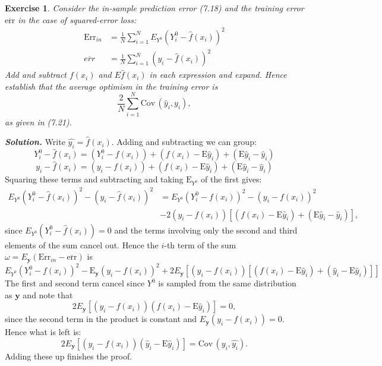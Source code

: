 \documentclass[12pt]{article}
\def\Err{\text{Err}}
\def\err{\text{err}}
\def\Cov{\text{Cov}}
\def\by{\textbf{y}}
\def\E{\text{E}}
\newtheorem{exercise}{Exercise}[section]
\newenvironment{solution}[1][\it{Solution}]{\textbf{#1. } }{\vspace{.5cm}}
\begin{document}
\begin{exercise}
    Consider the in-sample prediction error (7.18) and the training error $\overline{\err}$ in the case of squared-error loss:
    $$\begin{aligned}
        \Err_{in} &= \frac{1}{N} \sum_{i=1}^N E_{Y^0}(Y_i^0 - \hat{f}(x_i))^2 \\
        \overline{err} &= \frac{1}{N} \sum_{i=1}^N (y_i - \hat{f}(x_i))^2
    \end{aligned}$$
    Add and subtract $f(x_i)$ and $E\hat{f}(x_i)$ in each expression and expand. Hence establish that the average optimism in the training error is
    $$\frac{2}{N}\sum_{i=1}^N \Cov\,(\hat{y}_i, y_i),$$
    as given in (7.21).
\end{exercise}
\begin{solution}
    Write $\hat{y_i} = \hat{f}(x_i)$. Adding and subtracting we can group:
    $$Y_i^0 - \hat{f}(x_i) = (Y_i^0-f(x_i)) + (f(x_i) - \E\hat{y}_i) + (\E\hat{y}_i - \hat{y}_i)$$
    $$y_i - \hat{f}(x_i) = (y_i-f(x_i)) + (f(x_i) - \E\hat{y}_i) + (\E\hat{y}_i - \hat{y}_i)$$
    Squaring these terms and subtracting and taking $\E_{Y^0}$ of the first gives:
    $$\begin{aligned}
    E_{Y^0}(Y_i^0 - \hat{f}(x_i))^2 - (y_i - \hat{f}(x_i))^2 &= E_{Y^0}(Y_i^0-f(x_i))^2  - (y_i-f(x_i))^2 \\
    &- 2 (y_i-f(x_i))[(f(x_i) - \E\hat{y}_i) + (\E\hat{y}_i - \hat{y}_i)],
    \end{aligned}$$
    since $E_{Y^0}(Y_i^0 - \hat{f}(x_i)) = 0$ and the terms involving only the second and third elements of the sum cancel out. Hence the $i$-th term of the sum $\omega = E_\by (\Err_{in} - \overline{\err})$ is
    $$ E_{Y^0}(Y_i^0-f(x_i))^2  - \E_\by(y_i-f(x_i))^2 + 2 E_\by [(y_i-f(x_i))[(f(x_i) - \E\hat{y}_i) + (\hat{y}_i - \E \hat{y}_i) ]]$$
    The first and second term cancel since $Y^0$ is sampled from the same distribution as $\by$ and note that 
    $$   2 E_\by [(y_i-f(x_i))(f(x_i) - \E\hat{y}_i)] = 0, $$
    since the second term in the product is constant and $E_\by(y_i-f(x_i)) = 0$. Hence what is left is:
    $$2 E_\by [(y_i-f(x_i))(\hat{y}_i - \E \hat{y}_i)] = \Cov \, (y_i, \hat{y_i}).$$
    Adding these up finishes the proof.

\end{solution}
\end{document}
